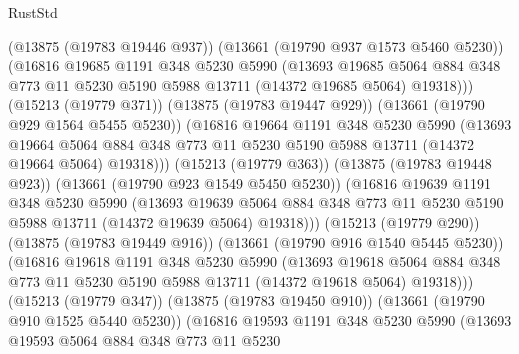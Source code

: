 \begin{lexlean}{RustStd}
\begin{coremodule}
                (@13875 (@19783 @19446 @937))
                (@13661 (@19790 @937 @1573 @5460 @5230))
                (@16816
                  @19685
                  @1191
                  @348
                  @5230
                  @5990
                  (@13693
                    @19685
                    @5064
                    @884
                    @348
                    @773
                    @11
                    @5230
                    @5190
                    @5988
                    @13711
                    (@14372 @19685 @5064)
                    @19318)))
              (@15213 (@19779 @371))
              (@13875 (@19783 @19447 @929))
              (@13661 (@19790 @929 @1564 @5455 @5230))
              (@16816
                @19664
                @1191
                @348
                @5230
                @5990
                (@13693
                  @19664
                  @5064
                  @884
                  @348
                  @773
                  @11
                  @5230
                  @5190
                  @5988
                  @13711
                  (@14372 @19664 @5064)
                  @19318)))
            (@15213 (@19779 @363))
            (@13875 (@19783 @19448 @923))
            (@13661 (@19790 @923 @1549 @5450 @5230))
            (@16816
              @19639
              @1191
              @348
              @5230
              @5990
              (@13693
                @19639
                @5064
                @884
                @348
                @773
                @11
                @5230
                @5190
                @5988
                @13711
                (@14372 @19639 @5064)
                @19318)))
          (@15213 (@19779 @290))
          (@13875 (@19783 @19449 @916))
          (@13661 (@19790 @916 @1540 @5445 @5230))
          (@16816
            @19618
            @1191
            @348
            @5230
            @5990
            (@13693
              @19618
              @5064
              @884
              @348
              @773
              @11
              @5230
              @5190
              @5988
              @13711
              (@14372 @19618 @5064)
              @19318)))
        (@15213 (@19779 @347))
        (@13875 (@19783 @19450 @910))
        (@13661 (@19790 @910 @1525 @5440 @5230))
        (@16816
          @19593
          @1191
          @348
          @5230
          @5990
          (@13693
            @19593
            @5064
            @884
            @348
            @773
            @11
            @5230

\end{coremodule}
\end{lexlean}
